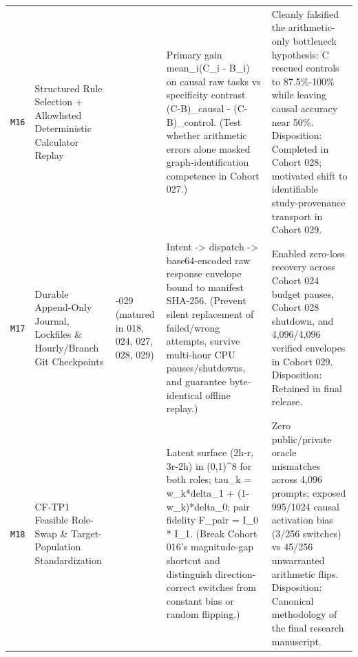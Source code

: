 {\begin{longtable}{@{}>{\raggedright\arraybackslash}p{0.9cm}>{\raggedright\arraybackslash}p{2.7cm}>{\raggedright\arraybackslash}p{1.7cm}>{\raggedright\arraybackslash}p{4.4cm}>{\raggedright\arraybackslash}p{4.7cm}@{}}
\texttt{M16} & Structured Rule Selection + Allowlisted Deterministic Calculator Replay & 028 & Primary gain mean\_i(C\_i -\allowbreak{} B\_i) on causal raw tasks vs specificity contrast (C-\allowbreak{}B)\_causal -\allowbreak{} (C-\allowbreak{}B)\_control. (Test whether arithmetic errors alone masked graph-\allowbreak{}identification competence in Cohort 027.) & Cleanly falsified the arithmetic-\allowbreak{}only bottleneck hypothesis: C rescued controls to 87.5\%-\allowbreak{}100\% while leaving causal accuracy near 50\%. Disposition: Completed in Cohort 028; motivated shift to identifiable study-\allowbreak{}provenance transport in Cohort 029. \\[2pt]
\texttt{M17} & Durable Append-\allowbreak{}Only Journal, Lockfiles \& Hourly/\allowbreak{}Branch Git Checkpoints & 001-\allowbreak{}029 (matured in 018, 024, 027, 028, 029) & Intent -\allowbreak{}> dispatch -\allowbreak{}> base64-\allowbreak{}encoded raw response envelope bound to manifest SHA-\allowbreak{}256. (Prevent silent replacement of failed/\allowbreak{}wrong attempts, survive multi-\allowbreak{}hour CPU pauses/\allowbreak{}shutdowns, and guarantee byte-\allowbreak{}identical offline replay.) & Enabled zero-\allowbreak{}loss recovery across Cohort 024 budget pauses, Cohort 028 shutdown, and 4,096/\allowbreak{}4,096 verified envelopes in Cohort 029. Disposition: Retained in final release. \\[2pt]
\texttt{M18} & CF-\allowbreak{}TP1 Feasible Role-\allowbreak{}Swap \& Target-\allowbreak{}Population Standardization & 029 & Latent surface (2h-\allowbreak{}r, 3r-\allowbreak{}2h) in (0,1)\textasciicircum{}8 for both roles; tau\_k = w\_k*delta\_1 + (1-\allowbreak{}w\_k)*delta\_0; pair fidelity F\_pair = I\_0 * I\_1. (Break Cohort 016's magnitude-\allowbreak{}gap shortcut and distinguish direction-\allowbreak{}correct switches from constant bias or random flipping.) & Zero public/\allowbreak{}private oracle mismatches across 4,096 prompts; exposed 995/\allowbreak{}1024 causal activation bias (3/\allowbreak{}256 switches) vs 45/\allowbreak{}256 unwarranted arithmetic flips. Disposition: Canonical methodology of the final research manuscript. \\[2pt]

\end{longtable}}
